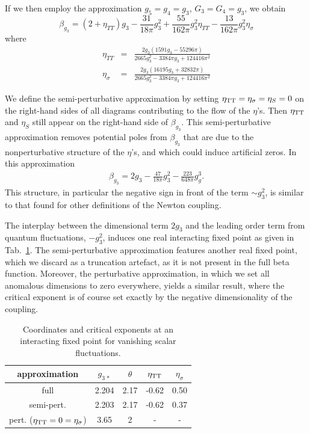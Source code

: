 \documentclass[11pt]{book} %
\newcommand{\be}{\begin{equation}}
\newcommand{\ee}{\end{equation}}
\newcommand{\bea}{\begin{eqnarray}}
\newcommand{\eea}{\end{eqnarray}}
\begin{document}
If we then employ the approximation $g_5 = g_4 = g_3$, $G_3 = G_4 = g_3$, we obtain
\be
\beta_{g_3}= (2+\eta_{TT})g_3
- \frac{31}{18 \pi}g_3^2
+\frac{55}{162\pi}g_3^2\eta_{TT}
-\frac{13}{162\pi}g_3^2\eta_\sigma
\ee
where
\bea
\eta_{TT}&=&\frac{2g_3(1591 g_3-55296 \pi)}{2665 g_3^2-3384\pi g_3 +124416 \pi^2}
\\
\eta_\sigma&=&\frac{2g_3(16195 g_3+32832 \pi)}{2665 g_3^2-3384\pi g_3 +124416 \pi^2}
\eea


We  define the semi-perturbative approximation by setting $\eta_{\rm TT}= \eta_{\sigma}=\eta_S = 0$ on the right-hand sides of all diagrams contributing to the flow of the $\eta$'s. Then $\eta_{\rm TT}$ and $\eta_S$ still appear on the right-hand side of $\beta_{g_3}$. This semi-perturbative approximation removes potential poles from $\beta_{g_3}$ that are due to the nonperturbative structure of the $\eta$'s, and which could induce artificial zeros.
In this approximation
\bea
\beta_{g_3}= 2g_3 - \frac{47}{18 \pi}g_3^2
-\frac{223}{648\pi}g_g^3.\label{purgravitysemipertbeta}
\eea
This structure, in particular the negative sign in front of the term $\sim g_3^2$, is similar to that found for other definitions of the Newton coupling.

The interplay between the dimensional term $2g_3$ and the leading order term from quantum fluctuations, $- g_3^2$, induces one real interacting fixed point as given in Tab.~\ref{puregravityFP_table}. The semi-perturbative approximation features another real fixed point, which we discard as a truncation artefact, as it is not present in the full beta function. Moreover, the perturbative approximation, in which we set all anomalous dimensions to zero everywhere, yields a similar result, where the critical exponent is of course set exactly by the negative dimensionality of the coupling.

\begin{table}[!here]
\begin{tabular}{ccccc}
approximation&$g_{3\,\ast}$& $\theta$& $\eta_{\rm TT}$& $\eta_{\sigma}$\\ \hline \hline
full & 2.204 & 2.17 & -0.62 & 0.50\\ \hline
semi-pert.&2.203 & 2.17 & -0.62 & 0.37 \\ \hline
pert. ($\eta_{\rm TT}=0=\eta_{\sigma}$)& 3.65 & 2 & - & - \\\hline\hline
\end{tabular}
\caption{\label{puregravityFP_table}Coordinates and critical exponents at an interacting fixed point for vanishing scalar fluctuations.}
\end{table}
\end{document}
